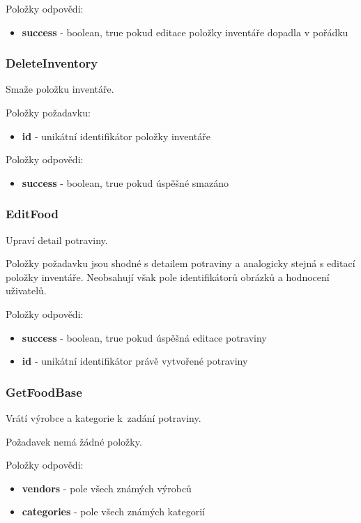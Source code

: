 \documentclass[thesis=B,czech]{FITthesis}[2013/10/20]
\begin{document}
Položky odpovědi:
\begin{itemize}
  \item \textbf{success} - boolean, true pokud editace položky inventáře dopadla v pořádku
\end{itemize}

\subsubsection{DeleteInventory}
Smaže položku inventáře.

Položky požadavku:
\begin{itemize}
  \item \textbf{id} - unikátní identifikátor položky inventáře
\end{itemize}

Položky odpovědi:
\begin{itemize}
  \item \textbf{success} - boolean, true pokud úspěšné smazáno
\end{itemize}

\subsubsection{EditFood}
Upraví detail potraviny.

Položky požadavku jsou shodné s detailem potraviny a analogicky stejná s editací položky inventáře. Neobsahují však pole identifikátorů obrázků a hodnocení uživatelů.

Položky odpovědi:
\begin{itemize}
  \item \textbf{success} - boolean, true pokud úspěšná editace potraviny
  \item \textbf{id} - unikátní identifikátor právě vytvořené potraviny
\end{itemize}

\subsubsection{GetFoodBase}
Vrátí výrobce a kategorie k~zadání potraviny.

Požadavek nemá žádné položky.

Položky odpovědi:
\begin{itemize}
  \item \textbf{vendors} - pole všech známých výrobců
  \item \textbf{categories} - pole všech známých kategorií
\end{itemize}
\end{document}
